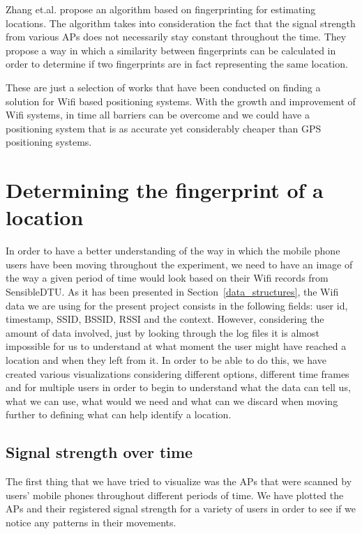 Zhang et.al. \cite{zhang2012polaris} propose an algorithm based on
fingerprinting for estimating locations. The algorithm takes into consideration
the fact that the signal strength from various APs does not necessarily stay
constant throughout the time. They propose a way in which a similarity between
fingerprints can be calculated in order to determine if two fingerprints are in
fact representing the same location.

These are just a selection of works that have been conducted on finding a
solution for Wifi based positioning systems. With the growth and improvement of
Wifi systems, in time all barriers can be overcome and we could have a
positioning system that is as accurate yet considerably cheaper than GPS
positioning systems.

\section{Determining the fingerprint of a location}
In order to have a better understanding of the way in which the mobile phone
users have been moving throughout the experiment, we need to have an image of
the way a given period of time would look based on their Wifi records from
SensibleDTU. As it has been presented in Section~\ref{data_structures}, the Wifi
data we are using for the present project consists in the following fields:
user id, timestamp, SSID, BSSID, RSSI and the context. However, considering the
amount of data involved, just by looking through the log files it is almost
impossible for us to understand at what moment the user might have reached a
location and when they left from it. In order to be able to do this, we have
created various visualizations considering different options, different time
frames and for multiple users in order to begin to understand what the data can
tell us, what we can use, what would we need and what can we discard when moving
further to defining what can help identify a location.

\subsection{Signal strength over time}

The first thing that we have tried to visualize was the APs that were scanned by
users' mobile phones throughout different periods of time. We have plotted the
APs and their registered signal strength for a variety of users in order to see
if we notice any patterns in their movements.

